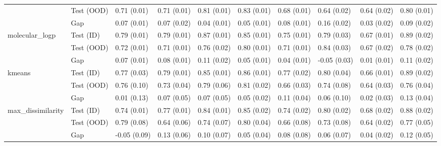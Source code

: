 \begin{tabular}{llllllllll}
 & Test (OOD) & 0.71 (0.01) & 0.71 (0.01) & 0.81 (0.01) & 0.83 (0.01) & 0.68 (0.01) & 0.64 (0.02) & 0.64 (0.02) & 0.80 (0.01) \\
 & Gap & 0.07 (0.01) & 0.07 (0.02) & 0.04 (0.01) & 0.05 (0.01) & 0.08 (0.01) & 0.16 (0.02) & 0.03 (0.02) & 0.09 (0.02) \\
\cline{1-10}
\multirow[t]{3}{*}{molecular_logp} & Test (ID) & 0.79 (0.01) & 0.79 (0.01) & 0.87 (0.01) & 0.85 (0.01) & 0.75 (0.01) & 0.79 (0.03) & 0.67 (0.01) & 0.89 (0.02) \\
 & Test (OOD) & 0.72 (0.01) & 0.71 (0.01) & 0.76 (0.02) & 0.80 (0.01) & 0.71 (0.01) & 0.84 (0.03) & 0.67 (0.02) & 0.78 (0.02) \\
 & Gap & 0.07 (0.01) & 0.08 (0.01) & 0.11 (0.02) & 0.05 (0.01) & 0.04 (0.01) & -0.05 (0.03) & 0.01 (0.01) & 0.11 (0.02) \\
\cline{1-10}
\multirow[t]{3}{*}{kmeans} & Test (ID) & 0.77 (0.03) & 0.79 (0.01) & 0.85 (0.01) & 0.86 (0.01) & 0.77 (0.02) & 0.80 (0.04) & 0.66 (0.01) & 0.89 (0.02) \\
 & Test (OOD) & 0.76 (0.10) & 0.73 (0.04) & 0.79 (0.06) & 0.81 (0.02) & 0.66 (0.03) & 0.74 (0.08) & 0.64 (0.03) & 0.76 (0.04) \\
 & Gap & 0.01 (0.13) & 0.07 (0.05) & 0.07 (0.05) & 0.05 (0.02) & 0.11 (0.04) & 0.06 (0.10) & 0.02 (0.03) & 0.13 (0.04) \\
\cline{1-10}
\multirow[t]{3}{*}{max_dissimilarity} & Test (ID) & 0.74 (0.01) & 0.77 (0.01) & 0.84 (0.01) & 0.85 (0.02) & 0.74 (0.02) & 0.80 (0.02) & 0.68 (0.02) & 0.88 (0.02) \\
 & Test (OOD) & 0.79 (0.08) & 0.64 (0.06) & 0.74 (0.07) & 0.80 (0.04) & 0.66 (0.08) & 0.73 (0.08) & 0.64 (0.02) & 0.77 (0.05) \\
 & Gap & -0.05 (0.09) & 0.13 (0.06) & 0.10 (0.07) & 0.05 (0.04) & 0.08 (0.08) & 0.06 (0.07) & 0.04 (0.02) & 0.12 (0.05) \\
\cline{1-10}
\bottomrule
\end{tabular}
